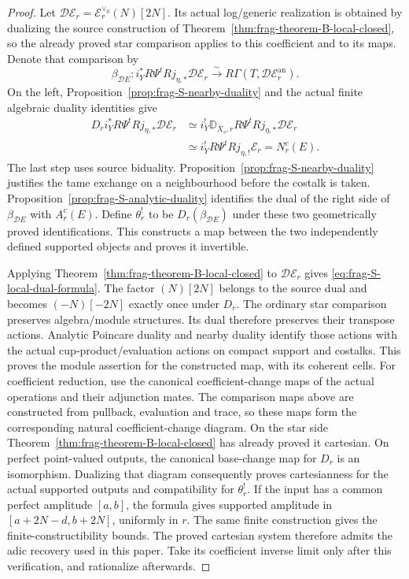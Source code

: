 \documentclass[11pt]{article}
\theoremstyle{definition}
\theoremstyle{remark}
\begin{document}
\begin{proof}
Let $\mathcal D\mathcal E_r=\mathcal E_r^{\vee_0}(N)[2N]$.
Its actual log/generic realization is obtained by dualizing the source
construction of Theorem~\ref{thm:frag-theorem-B-local-closed}, so the already proved star comparison
applies to this coefficient and to its maps.  Denote that comparison by
\[
 \beta_{\mathcal D E}:i_Y^*R\Psi^t Rj_{\eta,*}\mathcal D\mathcal E_r
          \xrightarrow{\sim}R\Gamma(T,\mathcal D\mathcal E_r^{\mathrm{an}}).
\]
On the left, Proposition~\ref{prop:frag-S-nearby-duality} and the actual finite algebraic duality identities give
\[
 \begin{aligned}
 D_r i_Y^*R\Psi^t Rj_{\eta,*}\mathcal D\mathcal E_r
 &\simeq i_Y^!\mathbb D_{\overline X_s,r}
                          R\Psi^t Rj_{\eta,*}\mathcal D\mathcal E_r\\
 &\simeq i_Y^!R\Psi^t Rj_{\eta,!}\mathcal E_r=N^c_r(E).
 \end{aligned}
\]
The last step uses source biduality.  Proposition~\ref{prop:frag-S-nearby-duality} justifies the tame exchange
on a neighbourhood before the costalk is taken.  Proposition~\ref{prop:frag-S-analytic-duality} identifies the
dual of the right side of $\beta_{\mathcal D E}$ with $A^c_r(E)$.
Define $\theta^!_r$ to be $D_r(\beta_{\mathcal D E})$ under these two
geometrically proved identifications.  This constructs a map between
the two independently defined supported objects and proves it invertible.

Applying Theorem~\ref{thm:frag-theorem-B-local-closed} to $\mathcal D\mathcal E_r$ gives
\eqref{eq:frag-S-local-dual-formula}.  The factor $(N)[2N]$ belongs to
the source dual and becomes $(-N)[-2N]$ exactly once under $D_r$.
The ordinary star comparison preserves algebra/module structures.
Its dual therefore preserves their transpose actions.  Analytic Poincare
duality and nearby duality identify those actions with the actual
cup-product/evaluation actions on compact support and costalks.
This proves the module assertion for the constructed map, with its
coherent cells.
For coefficient reduction, use the canonical coefficient-change maps
of the actual operations and their adjunction mates.  The comparison
maps above are constructed from pullback, evaluation and trace, so
these maps form the corresponding natural coefficient-change diagram.
On the star side Theorem~\ref{thm:frag-theorem-B-local-closed} has already proved it cartesian.
On perfect point-valued outputs, the canonical base-change map for
$D_r$ is an isomorphism.  Dualizing that diagram consequently proves
cartesianness for the actual supported outputs and compatibility for
$\theta^!_r$.
If the input has a common perfect amplitude $[a,b]$, the formula gives
supported amplitude in $[a+2N-d,b+2N]$, uniformly in $r$.  The same
finite construction gives the finite-constructibility bounds.  The
proved cartesian system therefore admits the adic recovery used in this
paper.  Take its coefficient inverse limit only after this verification,
and rationalize afterwards.  \end{proof}
\end{document}
